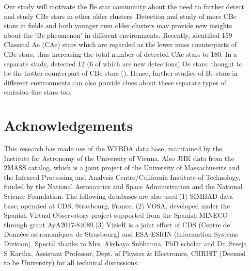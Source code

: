 \documentclass{jaa}
\begin{document}
Our study will motivate the Be star community about the need to further detect and study CBe stars in other older clusters. Detection and study of more CBe stars in fields and both younger cum older clusters may provide new insights about the `Be pheomenon' in different environments. Recently, \cite{2021Anusha} identified 159 Classical Ae (CAe) stars which are regarded as the lower mass counterparts of CBe stars, thus increasing the total number of detected CAe stars to 180. In a separate study, \cite{2021Li} detected 12 (6 of which are new detections) Oe stars: thought to be the hotter counterpart of CBe stars (\citealt{2013Rivinius}). Hence, further studies of Be stars in different environments can also provide clues about these separate types of emission-line stars too.

\section*{Acknowledgements}
This research has made use of the WEBDA data base, maintained by the Institute for Astronomy of the University of Vienna. Also JHK data from the 2MASS catalog, which is a joint project of the University of Massachusetts and the Infrared Processing and Analysis Centre/California Institute of Technology, funded by the National Aeronautics and Space Administration and the National Science Foundation. 
The following databases are also used:(1) SIMBAD data base, operated at CDS, Strasbourg, France. (2) VOSA, developed under the Spanish Virtual Observatory project supported from the Spanish MINECO through grant AyA2017-84089.(3) VizieR is a joint effort of CDS (Centre de Données astronomiques de Strasbourg) and ESA-ESRIN (Information Systems Division). Special thanks to Mrs. Akshaya Subbanna, PhD scholar and Dr. Sreeja S Kartha, Assistant Professor, Dept. of Physics \& Electronics, CHRIST (Deemed to be University) for all technical discussions.
\end{document}
